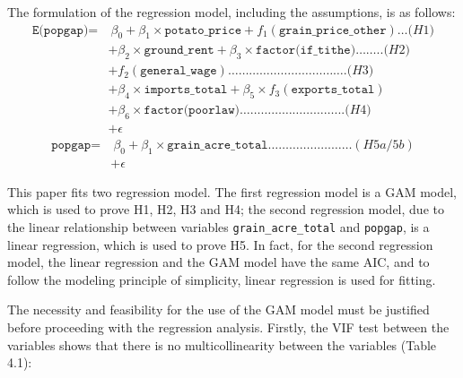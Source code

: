 The formulation of the regression model, including the assumptions, is as follows:
\vspace{-14pt}
\begin{align*}
\texttt{E(popgap)} = & \ \beta_0 + \beta_1 \times \texttt{potato\_price} + f_1(\texttt{grain\_price\_other}) \ldots \textit{(H1)} \\
                & + \beta_2 \times \texttt{ground\_rent} + \beta_3 \times \texttt{factor(if\_tithe)} \ldots \ldots .. \textit{(H2)} \\
                & + f_2(\texttt{general\_wage}) \ldots \ldots \ldots \ldots \ldots \ldots \ldots \ldots \ldots \ldots \ldots . \textit{(H3)} \\
                & + \beta_4 \times \texttt{imports\_total} + \beta_5 \times f_3(\texttt{exports\_total})\\
                & + \beta_6 \times \texttt{factor(poorlaw)} \ldots \ldots \ldots \ldots \ldots \ldots \ldots \ldots \ldots . .. \textit{(H4)} \\
                & + \epsilon
\end{align*}
\vspace{-2cm}
\begin{align*}
\texttt{popgap} = & \ \beta_0 + \beta_1 \times \texttt{grain\_acre\_total}  \ldots \ldots \ldots  \ldots \ldots \ldots \ldots \ldots (\textit{H5a/5b}) \\
& + \epsilon
\end{align*}

This paper fits two regression model. The first regression model is a GAM model, which is used to prove H1, H2, H3 and H4; the second regression model, due to the linear relationship between variables \texttt{grain\_acre\_total} and \texttt{popgap}, is a linear regression, which is used to prove H5. In fact, for the second regression model, the linear regression and the GAM model have the same AIC, and to follow the modeling principle of simplicity, linear regression is used for fitting.

The necessity and feasibility for the use of the GAM model must be justified before proceeding with the regression analysis. Firstly, the VIF test between the variables shows that there is no multicollinearity between the variables (Table 4.1):

